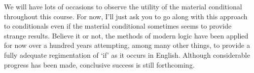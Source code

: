 We will have lots of occasions to observe the utility of the material conditional throughout this course.
For now, I'll just ask you to go along with this approach to conditionals even if the material conditional sometimes seems to provide strange results.
Believe it or not, the methods of modern logic have been applied for now over a hundred years attempting, among many other things, to provide a fully adequate regimentation of `if' as it occurs in English.
Although considerable progress has been made, conclusive success is still forthcoming.



%
%
%


